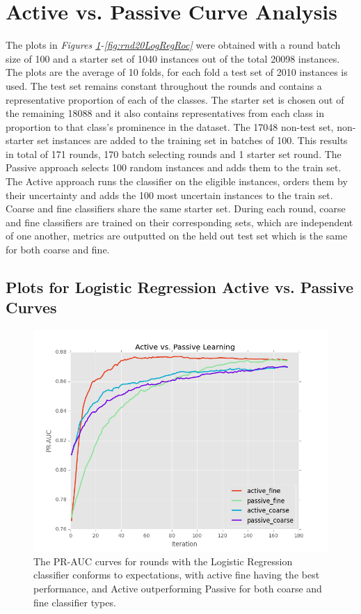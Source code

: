 \documentclass[ms]{nuthesis}
\begin{document}
\section{Active vs. Passive Curve Analysis}
\label{sect:actpass}
\par The plots in \textit{Figures \ref{fig:runActPassLogReg_pr}-\ref{fig:rnd20LogRegRoc}}
were obtained with a round batch size of 100
and a starter set of 1040 instances out of the total 20098 instances.
The plots are the average of 10 folds, for each fold a test set of 2010 instances
is used. The test set remains constant throughout the rounds and contains a representative proportion
 of each of the classes. The starter set is chosen out of the remaining 18088 and it also contains representatives
 from each class in proportion to that class's prominence in the dataset. The 17048 non-test set, non-starter set
  instances are added to the training set in batches of 100. This results in total of 171 rounds, 170 batch selecting
  rounds and 1 starter set round. The Passive approach selects 100 random instances
   and adds them to the train set. The Active approach runs the classifier on the eligible instances, orders them
   by their uncertainty and adds the 100 most uncertain instances to the train set. Coarse and fine classifiers
   share the same starter set. During each round, coarse and fine classifiers are trained on their corresponding
 sets, which are independent of one another, metrics are outputted on the held out test set which is the same for
 both coarse and fine.


\FloatBarrier
\subsection{Plots for Logistic Regression Active vs. Passive Curves}
\begin{figure}[!htb]
	\centering
    \includegraphics[width=1.0\columnwidth]{fig/runActPassLogReg_pr}
    \caption{The PR-AUC curves for rounds with the Logistic
Regression classifier conforms to expectations, with active fine having
the best performance, and Active outperforming Passive for both coarse
and fine classifier types.}
\label{fig:runActPassLogReg_pr}
\end{figure}
\FloatBarrier
\end{document}
